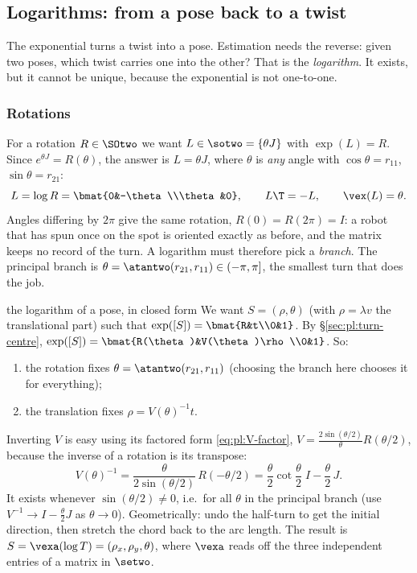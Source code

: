 \subsection{Logarithms: from a pose back to a twist}\label{sec:pl:logarithms}

The exponential turns a twist into a pose. Estimation needs the reverse: given two poses, which twist carries one into the other? That is the \emph{logarithm}. It exists, but it cannot be unique, because the exponential is not one-to-one.

\subsubsection{Rotations}
For a rotation $R\in\SOtwo$ we want $L\in\sotwo=\{\theta J\}$ with $\exp(L)=R$. Since $e^{\theta J}=R(\theta)$, the answer is $L=\theta J$, where $\theta$ is \emph{any} angle with $\cos\theta=r_{11}$, $\sin\theta=r_{21}$:
\[
L=\log R=\bmat{0&-\theta\\\theta&0},\qquad L\T=-L,\qquad \vex(L)=\theta .
\]
Angles differing by $2\pi$ give the same rotation, $R(0)=R(2\pi)=I$: a robot that has spun once on the spot is oriented exactly as before, and the matrix keeps no record of the turn. A logarithm must therefore pick a \emph{branch}. The principal branch is $\theta=\atantwo(r_{21},r_{11})\in(-\pi,\pi]$, the smallest turn that does the job.

\begin{deriv}{the logarithm of a pose, in closed form}
We want $S=(\rho,\theta)$ (with $\rho=\lambda v$ the translational part) such that $\exp([S])=\bmat{R&t\\0&1}$. By \S\ref{sec:pl:turn-centre}, $\exp([S])=\bmat{R(\theta)&V(\theta)\rho\\0&1}$. So:
\begin{enumerate}
\item the rotation fixes $\theta=\atantwo(r_{21},r_{11})$ (choosing the branch here chooses it for everything);
\item the translation fixes $\rho=V(\theta)^{-1}t$.
\end{enumerate}
Inverting $V$ is easy using its factored form \eqref{eq:pl:V-factor}, $V=\frac{2\sin(\theta/2)}{\theta}R(\theta/2)$, because the inverse of a rotation is its transpose:
\[
V(\theta)^{-1}=\frac{\theta}{2\sin(\theta/2)}\,R(-\theta/2)=\frac\theta2\cot\frac\theta2\;I-\frac\theta2\,J .
\]
It exists whenever $\sin(\theta/2)\neq0$, i.e.\ for all $\theta$ in the principal branch (use $V^{-1}\to I-\frac\theta2J$ as $\theta\to0$). Geometrically: undo the half-turn to get the initial direction, then stretch the chord back to the arc length. The result is $S=\vexa(\log T)=(\rho_x,\rho_y,\theta)$, where $\vexa$ reads off the three independent entries of a matrix in $\setwo$.
\end{deriv}

